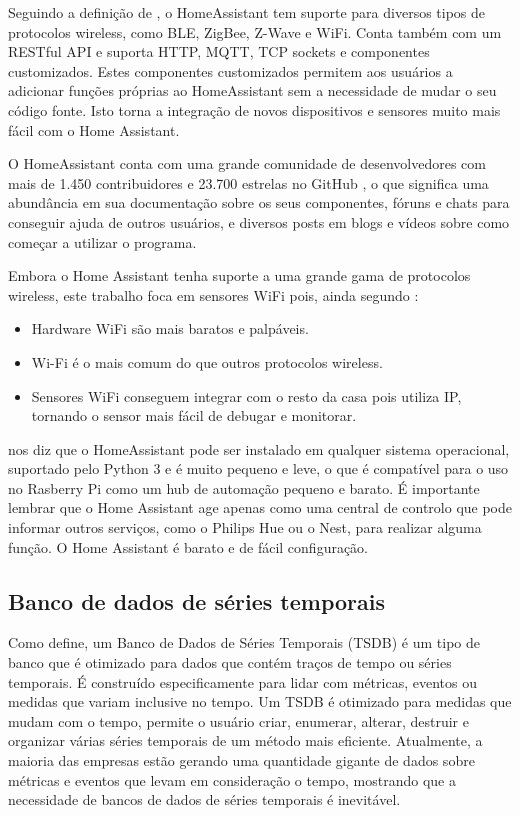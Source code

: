 Seguindo a definição de \cite{Gomes2018}, o HomeAssistant tem suporte para diversos tipos de protocolos wireless, como BLE, ZigBee, Z-Wave e WiFi. Conta também com um RESTful API e suporta HTTP, MQTT, TCP sockets e componentes customizados. Estes componentes customizados permitem aos usuários a adicionar funções próprias ao HomeAssistant sem a necessidade de mudar o seu código fonte. Isto torna a integração de novos dispositivos e sensores muito mais fácil com o Home Assistant.


O HomeAssistant conta com uma grande comunidade de desenvolvedores com mais de 1.450 contribuidores e 23.700 estrelas no GitHub \cite{githubhomeassistant}, o que significa uma abundância em sua documentação sobre os seus componentes, fóruns e chats para conseguir ajuda de outros usuários, e diversos posts em blogs e vídeos sobre como começar a utilizar o programa.

Embora o Home Assistant tenha suporte a uma grande gama de protocolos wireless, este trabalho foca em sensores WiFi pois, ainda segundo \cite{Lundrigan2017}:

\begin{itemize}
	\item Hardware WiFi são mais baratos e palpáveis.
	\item Wi-Fi é o mais comum do que outros protocolos wireless.
	\item Sensores WiFi conseguem integrar com o resto da casa pois utiliza IP, tornando o sensor mais fácil de debugar e monitorar.
\end{itemize}

\cite{AlmeidaCosta} nos diz que o HomeAssistant pode ser instalado em qualquer sistema operacional, suportado pelo Python 3 e é muito pequeno e leve, o que é compatível para o uso no Rasberry Pi como um hub de automação pequeno e barato. É importante lembrar que o Home Assistant age apenas como uma central de controlo que pode informar outros serviços, como o Philips Hue ou o Nest, para realizar alguma função. O Home Assistant é barato e de fácil configuração.

\subsection{Banco de dados de séries temporais}

Como \cite{Noor2017} define, um Banco de Dados de Séries Temporais (TSDB) é um tipo de banco que é otimizado para dados que contém traços de tempo ou séries temporais. É construído especificamente para lidar com métricas, eventos ou medidas que variam inclusive no tempo. Um TSDB é otimizado para medidas que mudam com o tempo, permite o usuário criar, enumerar, alterar, destruir e organizar várias séries temporais de um método mais eficiente. Atualmente, a maioria das empresas estão gerando uma quantidade gigante de dados sobre métricas e eventos que levam em consideração o tempo, mostrando que a necessidade de bancos de dados de séries temporais é inevitável.

